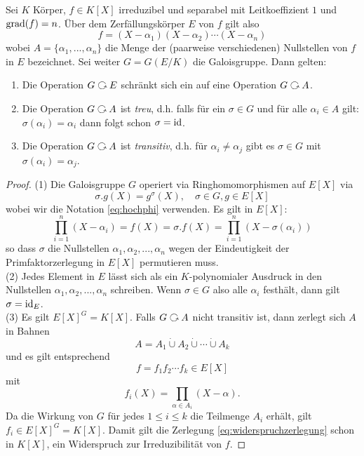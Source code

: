 \documentclass{book}
\begin{document}
\begin{thm}
    \label{thm:galop}
        Sei $K$ Körper, $f \in K[X]$ irreduzibel und separabel mit Leitkoeffizient $1$ und $\operatorname{grad}(f)
        = n$. Über dem Zerfällungskörper $E$ von $f$ gilt also
        \[
            f = (X-\alpha_1)(X-\alpha_2)\cdots (X-\alpha_n)
        \]
        wobei $A = \{ \alpha_1, ..., \alpha_n \}$ die Menge der (paarweise
        verschiedenen) Nullstellen von $f$ in $E$ bezeichnet. Sei weiter $G =
        G(E/K)$ die Galoisgruppe. Dann gelten:
        \begin{enumerate}
            \item Die Operation $G \actson E$ schränkt sich ein auf eine Operation $G \actson A$. 
            \item Die Operation $G \actson A$ ist \emph{treu}, d.h. falls für
                ein $\sigma \in G$ und für alle $\alpha_i \in A$ gilt:
                $\sigma(\alpha_i) = \alpha_i$ dann folgt schon $\sigma = \operatorname{id}$. 
            \item Die Operation $G \actson A$ ist \emph{transitiv}, d.h. für
                $\alpha_i \neq \alpha_j$ gibt es $\sigma \in G$ mit
                $\sigma(\alpha_i) = \alpha_j$.
        \end{enumerate}
\end{thm}
\begin{proof}
    (1) Die Galoisgruppe $G$ operiert via Ringhomomorphismen auf $E[X]$ via 
    \[
        \sigma.g(X) = g^{\sigma}(X), \quad \sigma \in G, g \in E[X]
    \]
    wobei wir die Notation \ref{eq:hochphi} verwenden. Es gilt in $E[X]$:
    \[
        \prod_{i=1}^n (X - \alpha_i) = f(X) = \sigma.f(X) = \prod_{i=1}^n (X - \sigma(\alpha_i))
    \]
    so dass $\sigma$ die Nullstellen $\alpha_1, \alpha_2, ..., \alpha_n$ wegen
    der Eindeutigkeit der Primfaktorzerlegung in $E[X]$ permutieren muss.\\

    \noindent
    (2) Jedes Element in $E$ lässt sich als ein $K$-polynomialer Ausdruck in
    den Nullstellen $\alpha_1, \alpha_2, ..., \alpha_n$ schreiben. Wenn $\sigma
    \in G$ also alle $\alpha_i$ festhält, dann gilt $\sigma = \operatorname{id}_E$.\\

    \noindent
    (3) Es gilt $E[X]^G = K[X]$. Falls $G \actson A$ nicht transitiv ist, dann
    zerlegt sich $A$ in Bahnen
    \[
        A = A_1 \dot{\cup} A_2 \dot{\cup} \cdots \dot{\cup} A_k
    \]
    und es gilt entsprechend
    \begin{equation}
        \label{eq:widerspruchzerlegung}
        f = f_1 f_2 \cdots f_k \in E[X]
    \end{equation}
    mit 
    \[
        f_i(X) = \prod_{\alpha \in A_i} (X - \alpha).
    \]
    Da die Wirkung von $G$ für jedes $1 \le i \le k$ die Teilmenge $A_i$
    erhält, gilt $f_i \in E[X]^G = K[X]$. Damit gilt die Zerlegung
    \eqref{eq:widerspruchzerlegung} schon in $K[X]$, ein Widerspruch zur
    Irreduzibilität von $f$. 
\end{proof}
\end{document}
